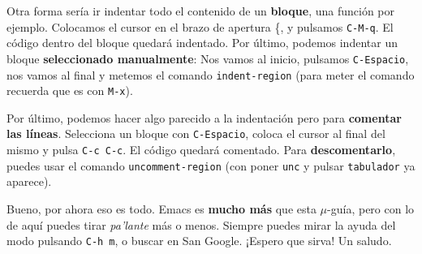 \documentclass{article}
\begin{document}
Otra forma sería ir indentar todo el contenido de un \textbf{bloque}, una función por ejemplo. Colocamos el cursor en el brazo de apertura \{, y pulsamos \texttt{C-M-q}. El código dentro del bloque quedará indentado. Por último, podemos indentar un bloque \textbf{seleccionado manualmente}: Nos vamos al inicio, pulsamos \texttt{C-Espacio}, nos vamos al final y metemos el comando \texttt{indent-region} (para meter el comando recuerda que es con \texttt{M-x}).

Por último, podemos hacer algo parecido a la indentación pero para \textbf{comentar las líneas}. Selecciona un bloque con \texttt{C-Espacio}, coloca el cursor al final del mismo y pulsa \texttt{C-c C-c}. El código quedará comentado. Para \textbf{descomentarlo}, puedes usar el comando \texttt{uncomment-region} (con poner \texttt{unc} y pulsar \texttt{tabulador} ya aparece).

Bueno, por ahora eso es todo. Emacs es \textbf{mucho más} que esta $\mu$-guía, pero con lo de aquí puedes tirar \textit{pa'lante} más o menos. Siempre puedes mirar la ayuda del modo pulsando \texttt{C-h m}, o buscar en San Google. ¡Espero que sirva! Un saludo.
\end{document}
